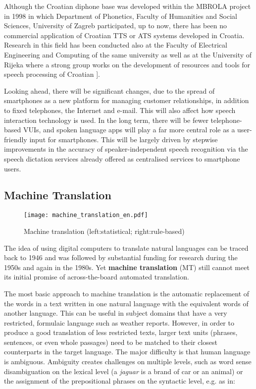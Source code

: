 \begin{multicols}{2}
Although the Croatian diphone base was developed within the MBROLA \cite{str20} project in 1998 in which Department of Phonetics, Faculty of Humanities and Social Sciences, University of Zagreb participated, up to now, there has been no commercial application of Croatian TTS or ATS systems developed in Croatia. Research in this field has been conducted also at the Faculty of Electrical Engineering and Computing of the same university \cite{art1} as well as at the University of Rijeka where a strong group works on the development of resources and tools for speech processing of Croatian \cite{str2, str21, art3}]. 

Looking ahead, there will be significant changes, due to the spread of smartphones as a new platform for managing customer relationships, in addition to fixed telephones, the Internet and e-mail. This will also affect how speech interaction technology is used. In the long term, there will be fewer telephone-based VUIs, and spoken language apps will play a far more central role as a user-friendly input for smartphones. This will be largely driven by stepwise improvements in the accuracy of speaker-independent speech recognition via the speech dictation services already offered as centralised services to smartphone users.

\subsection{Machine Translation}

\begin{figure*}[htb]
  \center
  \texttt{[image: machine\_translation\_en.pdf]}
  \caption{Machine translation (left:statistical; right:rule-based)}
  \label{fig:mtarch_en}
\end{figure*}

The idea of using digital computers to translate natural languages can be traced back to 1946 and was followed by substantial funding for research during the 1950s and again in the 1980s. Yet \textbf{machine translation} (MT) still cannot meet its initial promise of across-the-board automated translation.
 

The most basic approach to machine translation is the automatic replacement of the words in a text written in one natural language with the equivalent words of another language. This can be useful in subject domains that have a very restricted, formulaic language such as weather reports. However, in order to produce a good translation of less restricted texts, larger text units (phrases, sentences, or even whole passages) need to be matched to their closest counterparts in the target language. The major difficulty is that human language is ambiguous. Ambiguity creates challenges on multiple levels, such as word sense disambiguation on the lexical level (a \emph{jaguar} is a brand of car or an animal) or the assignment of the prepositional phrases on the syntactic level, e.g. as in:


\end{multicols}
